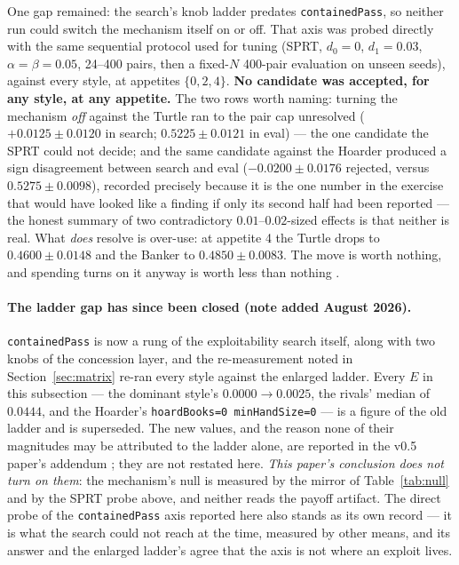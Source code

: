 \documentclass[11pt]{article}
\newcommand{\code}[1]{\texttt{#1}}
\begin{document}
One gap remained: the search's knob ladder predates \code{containedPass}, so
neither run could switch the mechanism itself on or off. That axis was probed
directly with the same sequential protocol used for tuning (SPRT,
$d_0 = 0$, $d_1 = 0.03$, $\alpha = \beta = 0.05$, 24--400 pairs, then a
fixed-$N$ 400-pair evaluation on unseen seeds), against every style, at
appetites $\{0, 2, 4\}$. \textbf{No candidate was accepted, for any style, at
any appetite.} The two rows worth naming: turning the mechanism \emph{off}
against the Turtle ran to the pair cap unresolved
($+0.0125 \pm 0.0120$ in search; $0.5225 \pm 0.0121$ in eval) --- the one
candidate the SPRT could not decide; and the same candidate against the
Hoarder produced a sign disagreement between search and eval
($-0.0200 \pm 0.0176$ rejected, versus $0.5275 \pm 0.0098$), recorded
precisely because it is the one number in the exercise that would have looked
like a finding if only its second half had been reported --- the honest
summary of two contradictory $0.01$--$0.02$-sized effects is that neither is
real. What \emph{does} resolve is over-use: at appetite 4 the Turtle drops to
$0.4600 \pm 0.0148$ and the Banker to $0.4850 \pm 0.0083$. The move is worth
nothing, and spending turns on it anyway is worth less than nothing
\cite{styles}.

\paragraph{The ladder gap has since been closed (note added August 2026).}
\code{containedPass} is now a rung of the exploitability search itself, along
with two knobs of the concession layer, and the re-measurement noted in
Section~\ref{sec:matrix} re-ran every style against the enlarged ladder. Every
$E$ in this subsection --- the dominant style's $0.0000 \to 0.0025$, the
rivals' median of $0.0444$, and the Hoarder's \code{hoardBooks=0
minHandSize=0} --- is a figure of the old ladder and is superseded. The new
values, and the reason none of their magnitudes may be attributed to the
ladder alone, are reported in the v0.5 paper's addendum \cite{v05}; they are
not restated here. \emph{This paper's conclusion does not turn on them}: the
mechanism's null is measured by the mirror of Table~\ref{tab:null} and by the
SPRT probe above, and neither reads the payoff artifact. The direct probe of
the \code{containedPass} axis reported here also stands as its own record ---
it is what the search could not reach at the time, measured by other means,
and its answer and the enlarged ladder's agree that the axis is not where an
exploit lives.
\end{document}
